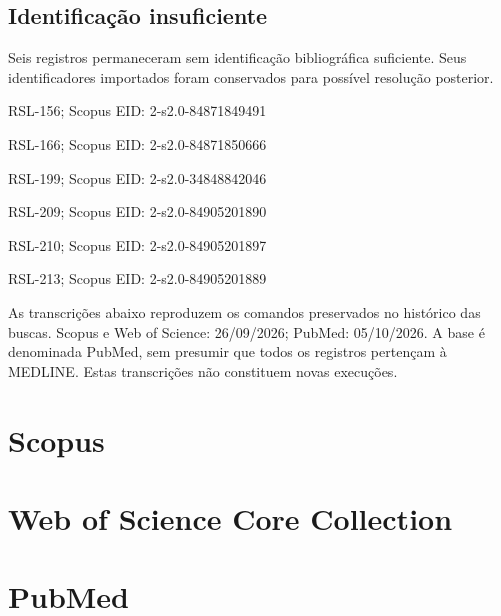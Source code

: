 \begin{samepage}
\section*{Identificação insuficiente}
Seis registros permaneceram sem identificação bibliográfica suficiente. Seus identificadores importados foram conservados para possível resolução posterior.

\noindent RSL-156; Scopus EID: 2-s2.0-84871849491\par
\noindent RSL-166; Scopus EID: 2-s2.0-84871850666\par
\noindent RSL-199; Scopus EID: 2-s2.0-34848842046\par
\noindent RSL-209; Scopus EID: 2-s2.0-84905201890\par
\noindent RSL-210; Scopus EID: 2-s2.0-84905201897\par
\noindent RSL-213; Scopus EID: 2-s2.0-84905201889\par
\end{samepage}
As transcrições abaixo reproduzem os comandos preservados no histórico das buscas. Scopus e Web of Science: 26/09/2026; PubMed: 05/10/2026. A base é denominada PubMed, sem presumir que todos os registros pertençam à MEDLINE. Estas transcrições não constituem novas execuções.

\section*{Scopus}

\section*{Web of Science Core Collection}

\section*{PubMed}
